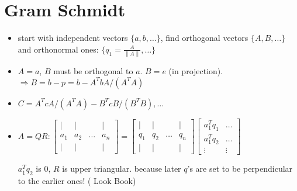\documentclass[a4paper,12pt]{article}
\begin{document}
\section{Gram Schmidt}
\begin{itemize}
\item start with independent vectors $\{a,b,\ldots \}$, find orthogonal vectors $\{A,B,\ldots \}$
and orthonormal ones: $\{q_1 = \frac{A}{\lVert A\rVert},\ldots \}$\\

\item $A = a$, $B$ must be orthogonal to $a$. $B=e$ (in projection). $\Longrightarrow B = b-p=b-A^TbA/(A^T A)$

\item $C = A^T c A / (A^T A) - B^T c B/(B^TB), \ldots$

\item $A = Q R: 
\begin{bmatrix}
\mid & \mid &        & \mid \\
a_1  & a_2  & \ldots & a_n \\
\mid & \mid &        & \mid
\end{bmatrix} = 
\begin{bmatrix}
\mid & \mid &        & \mid \\
q_1  & q_2  & \ldots & q_n \\
\mid & \mid &        & \mid
\end{bmatrix}
\begin{bmatrix}
a_1^Tq_1  & \ldots \\
a_1^Tq_2  & \ldots \\
\vdots    & \vdots
\end{bmatrix}$

$a_1^T q_2$ is $0$, $R$ is upper triangular. because later $q$'s are set to be perpendicular to the earlier ones! ( Look Book)
\end{itemize}
\end{document}
